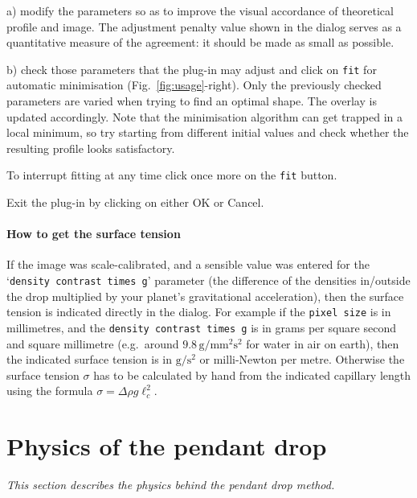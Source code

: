 \documentclass[fleqn]{scrartcl}
\begin{document}
a) modify the parameters so as to improve the visual accordance of
theoretical profile and image. The adjustment penalty value shown in
the dialog serves as a quantitative measure of the agreement: it
should be made as small as possible.

b) check those parameters that the plug-in may adjust and click on
\texttt{fit} for automatic minimisation (Fig.~\ref{fig:usage}-right).
Only the previously checked parameters are varied when trying to find
an optimal shape. The overlay is updated accordingly. Note that the
minimisation algorithm can get trapped in a local minimum, so try
starting from different initial values and check whether the resulting
profile looks satisfactory.

To interrupt fitting at any time click once more on the \texttt{fit}
button.

Exit the plug-in by clicking on either OK or Cancel.

\paragraph{How to get the surface tension}
If the image was scale-calibrated, and a sensible value was entered
for the `\texttt{density contrast times g}' parameter (the difference
of the densities in/outside the drop multiplied by your planet's
gravitational acceleration), then the surface tension is indicated
directly in the dialog. For example if the \texttt{pixel size} is in
millimetres, and the \texttt{density contrast times g} is in grams per
square second and square millimetre (e.g.\ around
$9.8\,\mathrm{g}/\mathrm{mm}^2\mathrm{s}^2$ for water in air on
earth), then the indicated surface tension is in
$\mathrm{g}/\mathrm{s}^2$ or milli-Newton per metre. Otherwise the
surface tension $\sigma$ has to be calculated by hand from the
indicated capillary length using the formula $\sigma = \Delta\!\rho g
\ell_c^2$.


\section{Physics of the pendant drop}
\label{sec:theory}

\textit{\small This section describes the physics behind the pendant drop method.\medskip}
\end{document}
